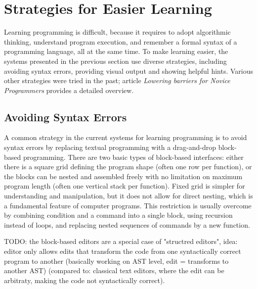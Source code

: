 

\section{Strategies for Easier Learning}
\label{sec:strategies-for-easier-learning}

Learning programming is difficult,
  because it requires
  to adopt algorithmic thinking,
  understand program execution,
  and remember a formal syntax of a programming language,
  all at the same time.
To make learning easier,
  the systems presented in the previous section use diverse strategies,
  including avoiding syntax errors,
  providing visual output
  and showing helpful hints.
Various other strategies were tried in the past;
article \emph{Lowering barriers for Novice Programmers}
  \cite{lowering-barriers}
  provides a detailed overview.


\subsection{Avoiding Syntax Errors}
\label{sec:avoiding-syntax-errors}

A common strategy in the current systems for learning programming is to avoid syntax errors
  by replacing textual programming with a drag-and-drop block-based programming.
There are two basic types of block-based interfaces:
  either there is a square grid defining the program shape
  (often one row per function),
  or the blocks can be nested and assembled freely with no limitation on maximum program length
  (often one vertical stack per function).
Fixed grid is simpler for understanding and manipulation,
  but it does not allow for direct nesting,
  which is a fundamental feature of computer programs.
This restriction is usually overcome by
  combining condition and a command into a single block,
  using recursion instead of loops,
  and replacing nested sequences of commands by a new function.

TODO: the block-based editors are a special case of "structred editors",
idea: editor only allows edits that transform the code from one syntactically correct
program to another (basically working on AST level, edit = transforms to another AST)
(compared to: classical text editors, where the edit can be arbitraty, making the code
not syntactically correct).

